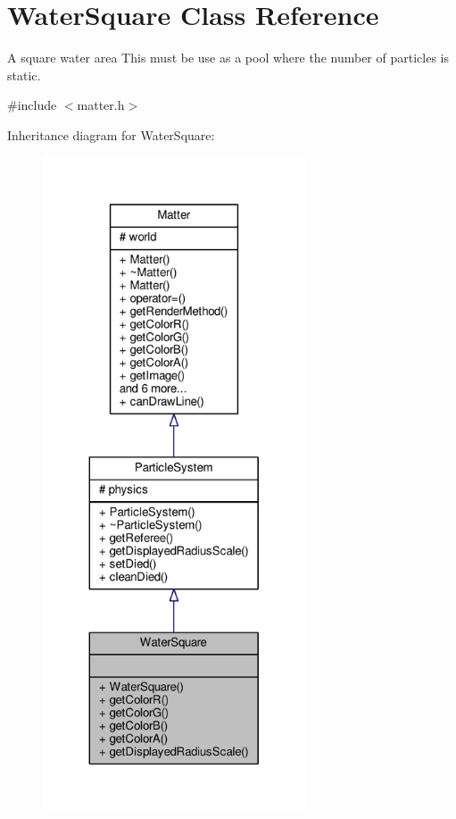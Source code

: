 \hypertarget{classWaterSquare}{}\section{Water\+Square Class Reference}
\label{classWaterSquare}


A square water area This must be use as a pool where the number of particles is static.  




{\ttfamily \#include $<$matter.\+h$>$}



Inheritance diagram for Water\+Square\+:\nopagebreak
\begin{figure}[H]
\begin{center}
\leavevmode
\includegraphics[height=550pt]{classWaterSquare__inherit__graph}
\end{center}
\end{figure}


